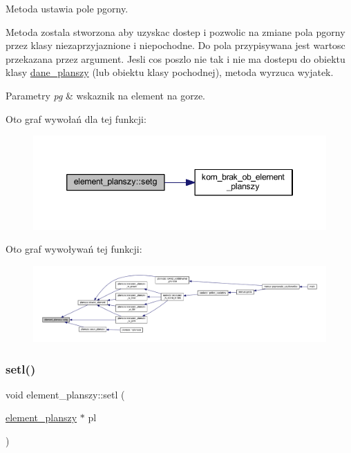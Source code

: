 Metoda ustawia pole pgorny.

Metoda zostala stworzona aby uzyskac dostep i pozwolic na zmiane pola pgorny przez klasy niezaprzyjaznione i niepochodne. Do pola przypisywana jest wartosc przekazana przez argument. Jesli cos poszlo nie tak i nie ma dostepu do obiektu klasy \mbox{\hyperlink{classdane__planszy}{dane\+\_\+planszy}} (lub obiektu klasy pochodnej), metoda wyrzuca wyjatek. 
\begin{DoxyParams}{Parametry}
{\em pg} & wskaznik na element na gorze. \\
\hline
\end{DoxyParams}
Oto graf wywołań dla tej funkcji\+:
\nopagebreak
\begin{figure}[H]
\begin{center}
\leavevmode
\includegraphics[width=346pt]{classelement__planszy_a77643f3091a8ee85206c4afc9b27c0c2_cgraph}
\end{center}
\end{figure}
Oto graf wywoływań tej funkcji\+:
\nopagebreak
\begin{figure}[H]
\begin{center}
\leavevmode
\includegraphics[width=350pt]{classelement__planszy_a77643f3091a8ee85206c4afc9b27c0c2_icgraph}
\end{center}
\end{figure}
\mbox{\label{classelement__planszy_a9e89f466ff2fe27b7796d84e3967599c}} 
\subsubsection{\texorpdfstring{setl()}{setl()}}
{\footnotesize\ttfamily void element\+\_\+planszy\+::setl (\begin{DoxyParamCaption}\item[{\mbox{\hyperlink{classelement__planszy}{element\+\_\+planszy}} $\ast$}]{pl }\end{DoxyParamCaption})}

